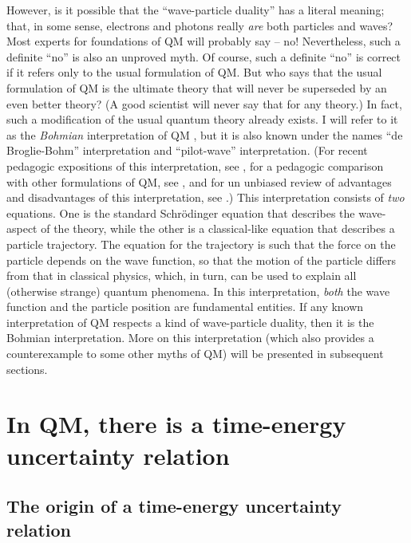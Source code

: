 \documentclass[12pt]{article}
\begin{document}
However, is it possible that the ``wave-particle duality'' has a 
literal meaning; that, in some sense, electrons and photons 
really {\em are} both particles and waves? Most experts 
for foundations of QM will probably say -- no! Nevertheless, 
such a definite ``no'' is also an unproved myth.
Of course, such a definite ``no'' is correct if it refers only 
to the usual formulation of QM. But who says that the usual 
formulation of QM is the ultimate theory that will never be 
superseded by an even better theory? (A good scientist will 
never say that for any theory.) 
In fact, such a modification of the usual quantum theory already 
exists. I will refer to it as the {\em Bohmian} interpretation 
of QM \cite{bohm}, but it is also known under the names 
``de Broglie-Bohm'' interpretation and ``pilot-wave'' interpretation.
(For recent pedagogic expositions of this interpretation, see
\cite{tumul,pas}, for a pedagogic comparison with other formulations 
of QM, see \cite{mnogoAJP}, and for un unbiased review 
of advantages and disadvantages of this interpretation,
see \cite{pas2}.)
This interpretation consists of {\em two} equations. One is the 
standard Schr\"odinger equation that describes the wave-aspect
of the theory, while the other is a classical-like equation that 
describes a particle trajectory. The equation for the 
trajectory is such that the force on the particle depends on the 
wave function, so that the motion of the particle differs 
from that in classical physics, which, in turn, can be used to explain
all (otherwise strange) quantum phenomena. In this interpretation, 
{\em both} 
the wave function and the particle position are fundamental 
entities. If any known interpretation of QM respects 
a kind of wave-particle duality, then it is the Bohmian interpretation.
More on this interpretation (which also provides a counterexample 
to some other myths of QM) will be presented in subsequent sections.   

\section{In QM, there is a time-energy uncertainty relation}

\subsection{The origin of a time-energy uncertainty relation}
\end{document}
